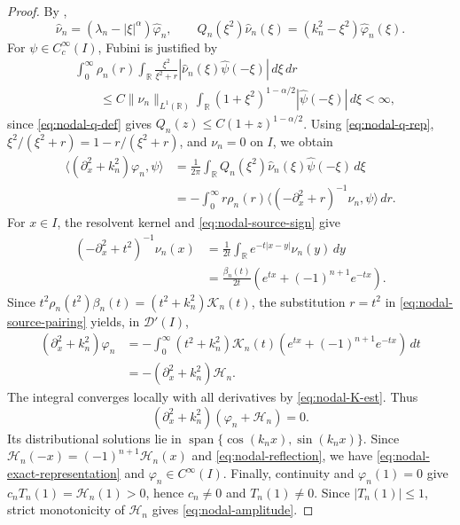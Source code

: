 \documentclass[11pt]{amsart}
\numberwithin{equation}{section}
\theoremstyle{remark}
\newcommand{\R}{\mathbb R}
\newcommand{\norm}[2][]{\lVert #2\rVert_{#1}}
\begin{document}
\begin{proof}
By ,
\begin{equation}\label{eq:nodal-mu-Fourier}
 \widehat\nu_n=(\lambda_n-|\xi|^\alpha)\widehat\varphi_n,\qquad
 Q_n(\xi^2)\widehat\nu_n(\xi)=(k_n^2-\xi^2)\widehat\varphi_n(\xi).
\end{equation}
For $\psi\in C_c^\infty(I)$, Fubini is justified by
\[
 \begin{aligned}
 &\int_0^\infty\rho_n(r)\int_\R\frac{\xi^2}{\xi^2+r}
       |\widehat\nu_n(\xi)\widehat\psi(-\xi)|\,d\xi\,dr\\
 &\qquad\le C\norm[L^1(\R)]{\nu_n}
       \int_\R(1+\xi^2)^{1-\alpha/2}|\widehat\psi(-\xi)|\,d\xi<\infty,
 \end{aligned}
\]
since \eqref{eq:nodal-q-def} gives $Q_n(z)\le C(1+z)^{1-\alpha/2}$.
Using \eqref{eq:nodal-q-rep}, $\xi^2/(\xi^2+r)=1-r/(\xi^2+r)$,
and $\nu_n=0$ on $I$, we obtain
\begin{equation}\label{eq:nodal-source-pairing}
 \begin{aligned}
 \langle(\partial_x^2+k_n^2)\varphi_n,\psi\rangle
 &=\frac1{2\pi}\int_\R Q_n(\xi^2)\widehat\nu_n(\xi)
                      \widehat\psi(-\xi)\,d\xi\\
 &=-\int_0^\infty r\rho_n(r)
       \langle(-\partial_x^2+r)^{-1}\nu_n,\psi\rangle\,dr.
 \end{aligned}
\end{equation}
For $x\in I$, the resolvent kernel and \eqref{eq:nodal-source-sign} give
\begin{equation}\label{eq:nodal-source-resolvent}
 \begin{aligned}
 (-\partial_x^2+t^2)^{-1}\nu_n(x)
 &=\frac1{2t}\int_\R e^{-t|x-y|}\nu_n(y)\,dy\\
 &=\frac{\beta_n(t)}{2t}(e^{tx}+(-1)^{n+1}e^{-tx}).
 \end{aligned}
\end{equation}
Since $t^2\rho_n(t^2)\beta_n(t)=(t^2+k_n^2)\mathcal K_n(t)$,
the substitution $r=t^2$ in \eqref{eq:nodal-source-pairing} yields, in $\mathcal D'(I)$,
\[
 \begin{aligned}
 (\partial_x^2+k_n^2)\varphi_n
 &=-\int_0^\infty(t^2+k_n^2)\mathcal K_n(t)
        (e^{tx}+(-1)^{n+1}e^{-tx})\,dt\\
 &=-(\partial_x^2+k_n^2)\mathcal H_n.
 \end{aligned}
\]
The integral converges locally with all derivatives by \eqref{eq:nodal-K-est}.
Thus
\begin{equation}\label{eq:nodal-ode}
 (\partial_x^2+k_n^2)(\varphi_n+\mathcal H_n)=0.
\end{equation}
Its distributional solutions lie in
$\operatorname{span}\{\cos(k_nx),\sin(k_nx)\}$.
Since $\mathcal{H}_n(-x)=(-1)^{n+1}\mathcal{H}_n(x)$ and \eqref{eq:nodal-reflection},  we have \eqref{eq:nodal-exact-representation}
and $\varphi_n\in C^\infty(I)$.
Finally, continuity and $\varphi_n(1)=0$ give
$c_nT_n(1)=\mathcal H_n(1)>0$, hence $c_n\ne0$ and $T_n(1)\ne0$.
Since $|T_n(1)|\le1$, strict monotonicity of $\mathcal H_n$
gives \eqref{eq:nodal-amplitude}.
\end{proof}
\end{document}
